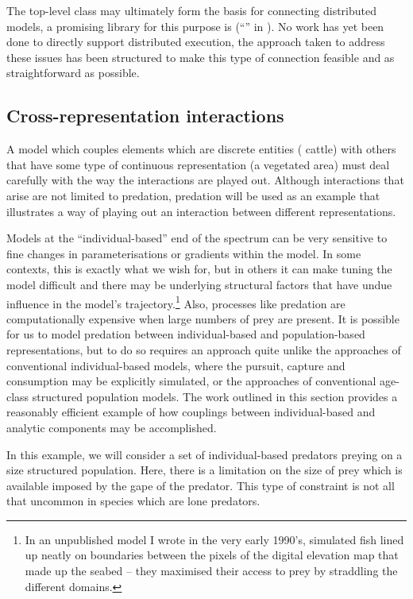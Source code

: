 The top-level  class may ultimately form the
basis for connecting distributed models, a promising library for this
purpose is 
(``'' in \cite{0MQ2012}). No work has yet been done to
directly support distributed execution, the approach taken to address
these issues has been structured to make this type of connection
feasible and as straightforward as possible.


\subsection{Cross-representation interactions\label{predation5}}

A model which couples elements which are discrete entities (\eg
cattle) with others that have some type of continuous representation
(\eg a vegetated area) must deal carefully with the way the
interactions are played out. Although interactions that arise are not
limited to predation, predation will be used as an example that
illustrates a way of playing out an interaction between different
representations. 

Models at the ``individual-based'' end of the spectrum can be very
sensitive to fine changes in parameterisations or gradients within the
model.  In some contexts, this is exactly what we wish for, but in
others it can make tuning the model difficult and there may be
underlying structural factors that have undue influence in the model's
trajectory.\footnote{In an unpublished model I wrote in the very early
1990's, simulated fish lined up neatly on boundaries between the
pixels of the digital elevation map that made up the seabed -- they
maximised their access to prey by straddling the different domains.}
Also, processes like predation are computationally expensive when
large numbers of prey are present.  It is possible for us to model
predation between individual-based and population-based
representations, but to do so requires an approach quite unlike the
approaches of conventional individual-based models, where the pursuit,
capture and consumption may be explicitly simulated, or the approaches
of conventional age-class structured population models.  The work
outlined in this section provides a reasonably efficient example of
how couplings between individual-based and analytic components may be
accomplished.

In this example, we will consider a set of individual-based predators
preying on a size structured population.  Here, there is a limitation
on the size of prey which is available imposed by the gape of the
predator. This type of constraint is not all that uncommon in species
which are lone predators.

